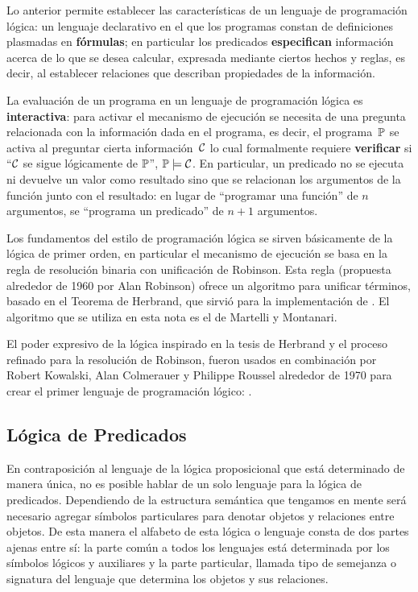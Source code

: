 \documentclass[11pt,letterpaper]{article}
\begin{document}
\medskip

Lo anterior permite establecer las caracter\'isticas de un lenguaje de 
programación lógica: un lenguaje declarativo en el que los 
programas constan de definiciones plasmadas en \textbf{f\'ormulas}; 
en particular los predicados \textbf{especifican} información acerca de lo que 
se desea calcular, expresada mediante ciertos hechos y reglas, es decir, al 
establecer relaciones que describan propiedades de la informaci\'on. 

La evaluación de un programa en un lenguaje de programaci\'on l\'ogica es 
\textbf{interactiva}: para activar el mecanismo de ejecución se necesita de una 
pregunta relacionada con la información dada en el programa, es decir, el 
programa~$\P$ se activa al preguntar cierta información~$\C$ lo cual 
formalmente requiere \textbf{verificar} si 
\enquote{$\C$ se sigue l\'ogicamente de $\P$}, $\P\models\C$.
En particular, un predicado no se ejecuta ni devuelve un valor como resultado 
sino que se relacionan los argumentos de la funci\'on junto con el resultado: 
en lugar de \enquote{programar una funci\'on} de $n$ argumentos, se 
\enquote{programa un predicado} de $n+1$ argumentos.

\bigskip

Los fundamentos del estilo de programación lógica se sirven básicamente de 
la lógica de primer orden, en particular el mecanismo de ejecución se basa en 
la regla de resolución binaria con unificación de Robinson. 
Esta regla (propuesta alrededor de 1960 por Alan Robinson) ofrece un algoritmo 
para unificar t\'erminos, basado en el Teorema de Herbrand, que sirvi\'o para la implementaci\'on de {\pl}.
El algoritmo que se utiliza en esta nota es el de Martelli y Montanari.

\bigskip

El poder expresivo de la l\'ogica inspirado en la tesis de Herbrand y 
el proceso refinado para la resolución de Robinson, fueron usados en 
combinaci\'on por Robert Kowalski, Alan Colmerauer y Philippe Roussel alrededor 
de 1970 para crear el primer lenguaje de programaci\'on l\'ogico: {\pl}.

\subsection{L\'ogica de Predicados}

En contraposición al lenguaje de la lógica proposicional que está
determinado de manera única, no es posible hablar de un solo lenguaje
para la lógica de predicados. Dependiendo de la estructura semántica
que tengamos en mente será necesario agregar símbolos particulares
para denotar objetos y relaciones entre objetos. De esta manera
el alfabeto de esta l\'ogica o lenguaje consta de dos partes ajenas entre sí: 
la parte común a todos los lenguajes está determinada por los símbolos lógicos y auxiliares y la parte particular, llamada tipo de semejanza o signatura del 
lenguaje que determina los objetos y sus relaciones.
\end{document}
